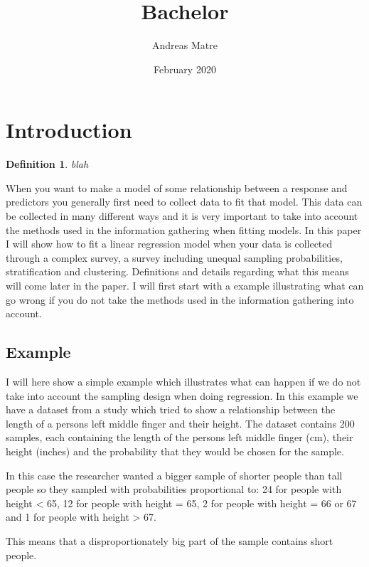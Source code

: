 \documentclass{article}
\title{Bachelor}
\author{Andreas Matre}
\date{February 2020}
\begin{document}
\newtheorem{definition}{Definition}[subsection]
\newtheorem{theorem}{Theorem}


\maketitle

\section{Introduction}
\begin{definition}
  blah
  \end{definition}

When you want to make a model of some relationship between a response and predictors you generally first need to collect data to fit that model. This data can be collected in many different ways and it is very important to take into account the methods used in the information gathering when fitting models. In this paper I will show how to fit a linear regression model when your data is collected through a complex survey, a survey including unequal sampling probabilities, stratification and clustering. Definitions and details regarding what this means will come later in the paper. I will first start with a example illustrating what can go wrong if you do not take the methods used in the information gathering into account.


\subsection{Example}

I will here show a simple example which illustrates what can happen if we do not take into account the sampling design when doing regression. In this example we have a dataset from a study which tried to show a relationship between the length of a persons left middle finger and their height. The dataset contains 200 samples, each containing the length of the persons left middle finger (cm), their height (inches) and the probability that they would be chosen for the sample.

In this case the researcher wanted a bigger sample of shorter people than tall people so they sampled with probabilities proportional to: 24 for people with height < 65, 12 for people with height = 65, 2 for people with height = 66 or 67 and 1 for people with height > 67.


This means that a disproportionately big part of the sample contains short people. 
\end{document}
